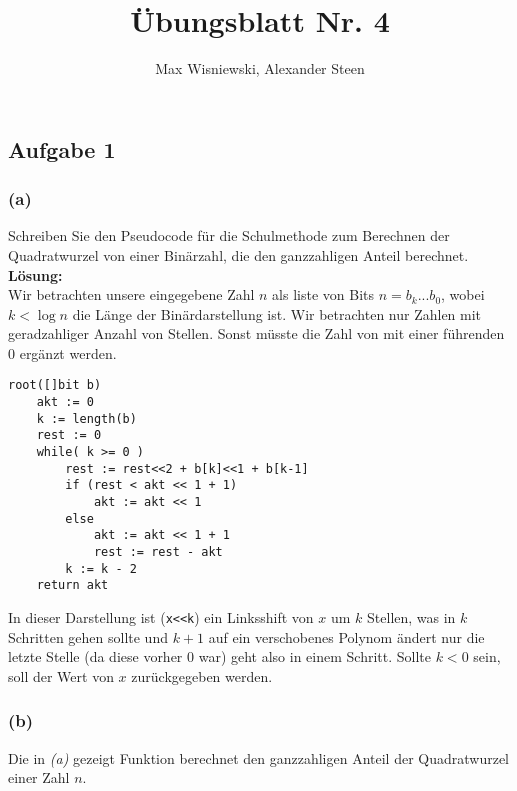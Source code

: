 \documentclass[11pt,a4paper,ngerman]{article}
\date{}
\title{Übungsblatt Nr. 4}
\author{Max Wisniewski, Alexander Steen}
\begin{document}
\renewcommand{\figurename}{Figure}
\maketitle
\thispagestyle{fancy}

\subsection*{Aufgabe 1}

\subsubsection*{(a)}

Schreiben Sie den Pseudocode für die Schulmethode zum Berechnen der Quadratwurzel von einer Binärzahl, die den ganzzahligen Anteil berechnet.\\

\textbf{Lösung:}\\

Wir betrachten unsere eingegebene Zahl $n$ als liste von Bits $n=b_k...b_0$, wobei $k < \log n$ die Länge der Binärdarstellung ist.
Wir betrachten nur Zahlen mit geradzahliger Anzahl von Stellen. Sonst müsste die Zahl von mit einer führenden $0$ ergänzt werden.

\begin{lstlisting}[frame=single]
root([]bit b)
    akt := 0
    k := length(b)
    rest := 0
    while( k >= 0 )
        rest := rest<<2 + b[k]<<1 + b[k-1]
        if (rest < akt << 1 + 1)
            akt := akt << 1
        else
            akt := akt << 1 + 1
            rest := rest - akt
        k := k - 2
    return akt
\end{lstlisting}

In dieser Darstellung ist (\lstinline|x<<k|) ein Linksshift von $x$ um $k$ Stellen, was in $k$ Schritten gehen sollte und $k+1$ auf ein verschobenes
Polynom ändert nur die letzte Stelle (da diese vorher 0 war) geht also in einem Schritt. Sollte $k<0$ sein, soll der Wert von $x$ zurückgegeben werden.\\

\subsubsection*{(b)}

Die in \emph{(a)} gezeigt Funktion berechnet den ganzzahligen Anteil der Quadratwurzel einer Zahl $n$.\\
\end{document}
